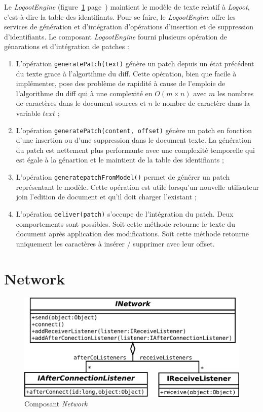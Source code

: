   Le \emph{LogootEngine} (figure~\ref{fig:logootengine}
  page~\pageref{fig:logootengine}) maintient le modèle de texte relatif
  à \emph{Logoot}, c'est-à-dire la table des identifiants. Pour se faire, le
  \emph{LogootEngine} offre les services de génération et d'intégration
  d'opérations d'insertion et de suppression d'identifiants. Le composant
  \emph{LogootEngine} fourni plusieurs opération de génarations et d'intégration
  de patches : 
  \begin{enumerate}
    \item L'opération \verb?generatePatch(text)? génère un patch
    depuis un état précédent du texte grace à l'algortihme du diff. Cette
    opération, bien que facile à implémenter, pose des problème de rapidité à
    cause de l'emploie de l'algorithme du diff qui à une complexité en
    $O(m \times n)$ avec $m$ les nombres de caractères dans le document sources
    et $n$ le nombre de caractère dans la variable $text$ ;
    \item L'opération \verb?generatePatch(content, offset)? génère un
    patch en fonction d'une insertion ou d'une suppression dans le document
    texte. La génération du patch est nettement plus performante avec une
    complexité temporelle qui est égale à la génartion et le maintient de la
    table des identifiants ;
    \item L'opération \verb?generatepatchFromModel()? permet de générer un patch
    représentant le modèle. Cette opération est utile lorsqu'un nouvelle
    utilisateur join l'edition de document et qu'il doit charger l'existant ;
    \item L'opération \verb?deliver(patch)? s'occupe de l'intégration du patch.
    Deux comportements sont possibles. Soit cette méthode retourne le texte
    du document après application des modifications. Soit cette
    méthode retourne uniquement les caractères à insérer / supprimer avec
    leur offset.
  \end{enumerate}

  \section{Network}
  \begin{figure}[hbt]
    \center
    \label{fig:logootengine}
    \includegraphics[width=.7\textwidth]{includes/model/INetwork.pdf}
    \caption{Composant \emph{Network}}
  \end{figure}

